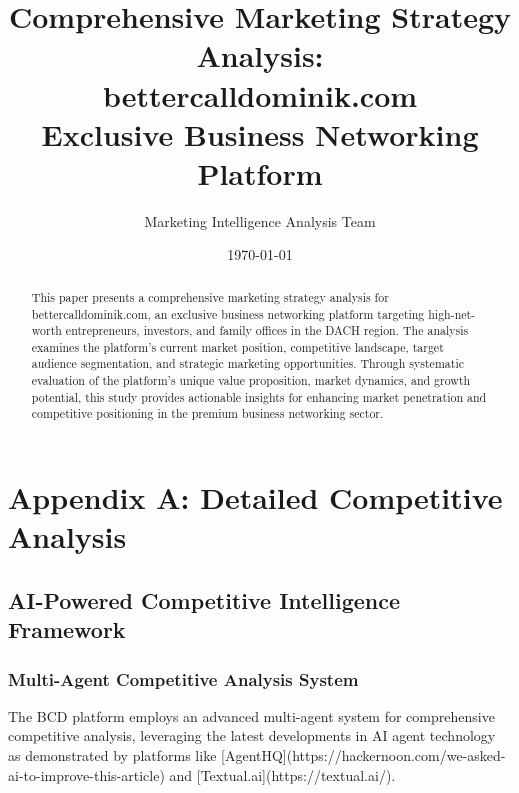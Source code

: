\documentclass[12pt,a4paper]{book}
\title{\textbf{Comprehensive Marketing Strategy Analysis:\\
bettercalldominik.com\\
Exclusive Business Networking Platform}}
\author{Marketing Intelligence Analysis Team}
\date{\today}
\begin{document}
\frontmatter

\maketitle

\begin{abstract}
This paper presents a comprehensive marketing strategy analysis for bettercalldominik.com, an exclusive business networking platform targeting high-net-worth entrepreneurs, investors, and family offices in the DACH region. The analysis examines the platform's current market position, competitive landscape, target audience segmentation, and strategic marketing opportunities. Through systematic evaluation of the platform's unique value proposition, market dynamics, and growth potential, this study provides actionable insights for enhancing market penetration and competitive positioning in the premium business networking sector.
\end{abstract}

\tableofcontents
\listoffigures
\listoftables

\mainmatter










\backmatter

\appendix

\chapter{Appendix A: Detailed Competitive Analysis}

\section{AI-Powered Competitive Intelligence Framework}

\subsection{Multi-Agent Competitive Analysis System}

The BCD platform employs an advanced multi-agent system for comprehensive competitive analysis, leveraging the latest developments in AI agent technology as demonstrated by platforms like [AgentHQ](https://hackernoon.com/we-asked-ai-to-improve-this-article) and [Textual.ai](https://textual.ai/).
\end{document}
